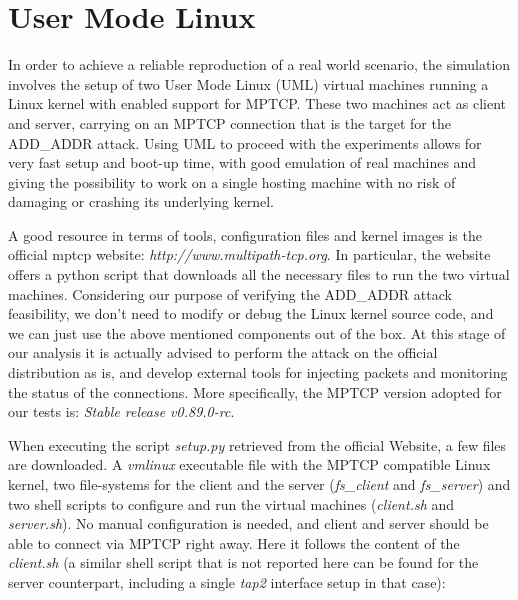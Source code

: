 \section{User Mode Linux}
In order to achieve a reliable reproduction of a real world scenario, the simulation involves the setup of two User Mode Linux (UML) virtual machines running a Linux kernel with enabled support for MPTCP. These two machines act as client and server, carrying on an MPTCP connection that is the target for the ADD\_ADDR attack. 
Using UML to proceed with the experiments allows for very fast setup and boot-up time, with good emulation of real machines and giving the possibility to work on a single hosting machine with no risk of damaging or crashing its underlying kernel.

A good resource in terms of tools, configuration files and kernel images is the official mptcp website:
\textit{http://www.multipath-tcp.org}. In particular, the website offers a python script that downloads all the necessary files to run the two virtual machines. Considering our purpose of verifying the ADD\_ADDR attack feasibility, we don't need to modify or debug the Linux kernel source code, and we can just use the above mentioned components out of the box. At this stage of our analysis it is actually advised to perform the attack on the official distribution as is, and develop external tools for injecting packets and monitoring the status of the connections. More specifically, the MPTCP version adopted for our tests is: \textit{Stable release v0.89.0-rc}.

When executing the script \textit{setup.py} retrieved from the official Website, a few files are downloaded. A \textit{vmlinux} executable file with the MPTCP compatible Linux kernel, two file-systems for the client and the server (\textit{fs\_client} and \textit{fs\_server}) and two shell scripts to configure and run the virtual machines (\textit{client.sh} and \textit{server.sh}). No manual configuration is needed, and client and server should be able to connect via MPTCP right away.
Here it follows the content of the \textit{client.sh} (a similar shell script that is not reported here can be found for the server counterpart, including a single \textit{tap2} interface setup in that case):


